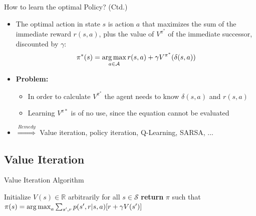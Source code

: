 \begin{frame}{How to learn the optimal Policy? (Ctd.)}{}
	\begin{itemize}
		\item The optimal action in state $s$ is action $a$ that maximizes the sum of the immediate reward $r(s, a)$,
			plus the value of $V^{\pi^*}$ of the immediate successor, discounted by $\gamma$:
		\begin{equation}
			\pi^*(s) = \operatorname*{arg\,max}_{a \in \mathcal{A}} r(s, a) + \gamma V^{\pi^*}(\delta(s, a))
		\end{equation}
		\item \textbf{Problem:}
		\begin{itemize}
			\item In order to calculate $V^{\pi^*}$ the agent needs to know $\delta(s, a)$ and $r(s, a)$
			\item Learning $V^{\pi*}$ is of no use, since the equation cannot be evaluated
		\end{itemize}
		\item $\overset{Remedy}{\Longrightarrow}$ Value iteration, policy iteration, Q-Learning, SARSA, ...
	\end{itemize}
\end{frame}


\subsection{Value Iteration}

\begin{frame}{Value Iteration Algorithm}{}
	\begin{algorithm}[H]
		\footnotesize
		\DontPrintSemicolon
		\vspace*{1mm}
 		Initialize $V(s) \in \mathbb{R}$ arbitrarily for all $s \in \mathcal{S}$\;
		\textbf{return} $\pi$ such that $\pi(s) = \operatorname*{arg\,max}_a \sum_{s', r} p(s', r \vert s, a)[r + \gamma V(s')]$\;
 		\caption{Value Iteration}
	\end{algorithm}
\end{frame}


